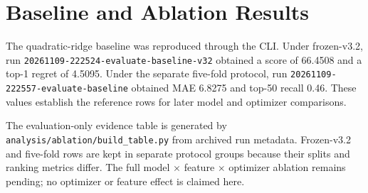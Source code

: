 \section{Baseline and Ablation Results}
The quadratic-ridge baseline was reproduced through the CLI. Under frozen-v3.2, run \texttt{20261109-222524-evaluate-baseline-v32} obtained a score of 66.4508 and a top-1 regret of 4.5095. Under the separate five-fold protocol, run \texttt{20261109-222557-evaluate-baseline} obtained MAE 6.8275 and top-50 recall 0.46. These values establish the reference rows for later model and optimizer comparisons.

The evaluation-only evidence table is generated by \texttt{analysis/ablation/build\_table.py} from archived run metadata. Frozen-v3.2 and five-fold rows are kept in separate protocol groups because their splits and ranking metrics differ. The full model $\times$ feature $\times$ optimizer ablation remains pending; no optimizer or feature effect is claimed here.

